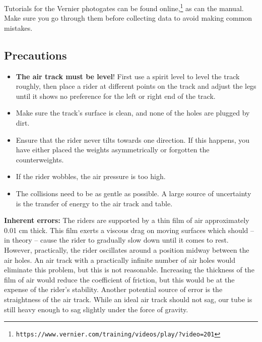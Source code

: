 \begin{tip}
    Tutorials for the Vernier photogates can be found online,\footnote{\nolinkurl{https://www.vernier.com/training/videos/play/?video=201}} as can the manual. Make sure you go through them before collecting data to avoid making common mistakes.
\end{tip}

\subsection*{Precautions}
\begin{itemize}
\itemsep0em
\item \textbf{The air track must be level}! First use a spirit level to level the track roughly, then place a rider at different points on the track and adjust the legs until it shows no preference for the left or right end of the track.

\item Make sure the track's surface is clean, and none of the holes are plugged by dirt.

\item Ensure that the rider never tilts towards one direction. If this happens, you have either placed the weights asymmetrically or forgotten the counterweights.

\item If the rider wobbles, the air pressure is too high.

\item The collisions need to be as gentle as possible. A large source of uncertainty is the transfer of energy to the air track and table.
\end{itemize}

\begin{imp}
\textbf{Inherent errors:}
The riders are supported by a thin film of air approximately 0.01 cm thick. This film exerts a viscous drag on moving surfaces which should -- in theory -- cause the rider to gradually slow down until it comes to rest. However, practically, the rider oscillates around a position midway between the air holes. An air track with a practically infinite number of air holes would eliminate this problem, but this is not reasonable. Increasing the thickness of the film of air would reduce the coefficient of friction, but this would be at the expense of the rider's stability. Another potential source of error is the straightness of the air track. While an ideal air track should not sag, our tube is still heavy enough to sag slightly under the force of gravity. 
\end{imp}


